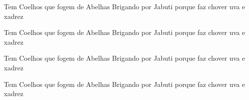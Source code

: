 \documentclass[a4paper]{article}
\newcommand{\frase}{Tem Coelhos que fogem de Abelhas Brigando por Jabuti porque faz chover uva e xadrez}
\begin{document}
{\fonteUtopia \frase}

{\fonteUtopiaItalico \frase}

{\fonteUtopiaNegrito \frase}

{\fonteUtopiaNegritoItalico \frase}
\end{document}
